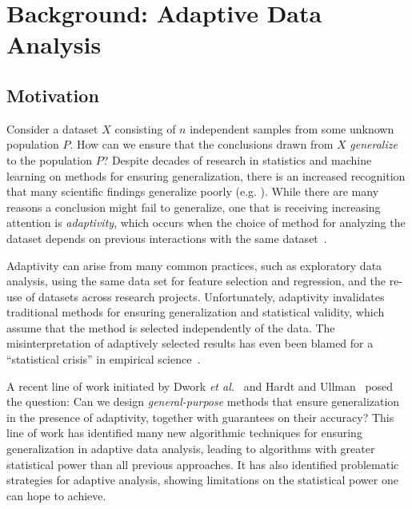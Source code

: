 \section{Background: Adaptive Data Analysis}

\newcommand{\dist}{P}
\newcommand{\mech}{M}
\newcommand{\univ}{\mathcal{X}}
\newcommand{\anyl}{A}
\newcommand{\query}{f}
\newcommand{\qlen}{k}
\newcommand{\qrounds}{r}
\newcommand{\answer}{a}
\newcommand{\sample}{X}
\newcommand{\etal}{\emph{et al.}}
\newcommand{\ex}[2]{{\ifx&#1& \mathbb{E} \else \underset{#1}{\mathbb{E}} \fi \left[#2\right]}}
\newcommand{\pr}[2]{{\ifx&#1& \mathbb{P} \else \underset{#1}{\mathbb{P}} \fi \left[#2\right]}}
\newcommand{\var}[2]{{\ifx&#1& \mathrm{Var} \else \underset{#1}{\mathrm{Var}} \fi \left[#2\right]}}
\newcommand{\eps}{\varepsilon}
\newcommand{\from}{:}

\subsection{Motivation}

Consider a dataset $X$ consisting of $n$ independent samples from some  unknown population $\dist$.  How can we ensure that the conclusions drawn from $X$ \emph{generalize} to the population $\dist$?  Despite decades of research in statistics and machine learning on methods for ensuring generalization, there is an increased recognition that many scientific findings generalize poorly (e.g. \cite{Ioannidis05}).  While there are many reasons a conclusion might fail to generalize, one that is receiving increasing attention is \emph{adaptivity}, which occurs when the choice of method for analyzing the dataset depends on previous interactions with the same dataset~\cite{???}.

 Adaptivity can arise from many common practices, such as exploratory data analysis, using the same data set for feature selection and regression, and the re-use of datasets across research projects.  Unfortunately, adaptivity invalidates traditional methods for ensuring generalization and statistical validity, which assume that the method is selected independently of the data. The misinterpretation of adaptively selected results has even been blamed for a ``statistical crisis'' in empirical science~\cite{GelmanL13}.

A recent line of work initiated by Dwork \etal~\cite{DworkFHPRR15} and Hardt and Ullman~\cite{HardtU14} posed the question: Can we design \emph{general-purpose} methods that ensure generalization in the presence of adaptivity, together with guarantees on their accuracy?  This line of work has identified many new algorithmic techniques for ensuring generalization in adaptive data analysis, leading to algorithms with greater statistical power than all previous approaches.  It has also identified problematic strategies for adaptive analysis, showing limitations on the statistical power one can hope to achieve.

